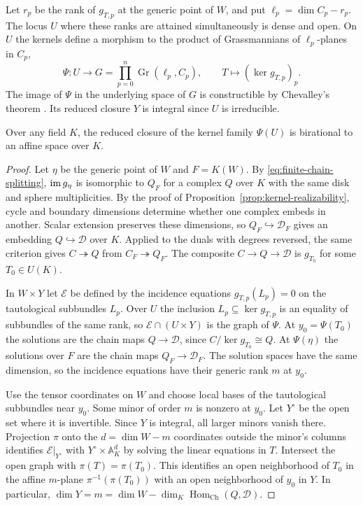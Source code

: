 Let $r_p$ be the rank of $g_{T,p}$ at the generic point of $W$,
and put $\ell_p=\dim C_p-r_p$. The locus $U$ where these ranks are attained
simultaneously is dense and open. On $U$ the kernels define a morphism to
the product of Grassmannians of $\ell_p$-planes in $C_p$,
\begin{equation}\label{eq:kernel-map}
 \Psi:U\longrightarrow G=\prod_{p=0}^n\operatorname{Gr}(\ell_p,C_p),
 \qquad T\longmapsto (\ker g_{T,p})_p.
\end{equation}
The image of $\Psi$ in the underlying space of $G$ is constructible by
Chevalley's theorem \cite[Tag 054K]{Stacks}. Its reduced closure $Y$ is integral since $U$ is irreducible.

\begin{proposition}\label{prop:kernel-rationality}
Over any field $K$, the reduced closure of the kernel family $\Psi(U)$ is
birational to an affine space over $K$.
\end{proposition}
\begin{proof}
Let $\eta$ be the generic point of $W$ and $F=K(W)$. By
\eqref{eq:finite-chain-splitting}, $\operatorname{im} g_\eta$ is isomorphic to $Q_F$ for a
complex $Q$ over $K$ with the same disk and sphere multiplicities.
By the proof of Proposition~\ref{prop:kernel-realizability}, cycle and boundary
dimensions determine whether one complex embeds in another. Scalar extension
preserves these dimensions, so $Q_F\hookrightarrow\mathcal D_F$ gives an embedding
$Q\hookrightarrow\mathcal D$ over $K$. Applied to the duals with degrees reversed,
the same criterion gives $C\twoheadrightarrow Q$ from $C_F\twoheadrightarrow Q_F$.
The composite $C\to Q\to\mathcal D$ is $g_{T_0}$ for some $T_0\in U(K)$.

In $W\times Y$ let $\mathcal E$ be defined by the incidence equations
$g_{T,p}(L_p)=0$ on the tautological subbundles $L_p$.
Over $U$ the inclusion $L_p\subseteq\ker g_{T,p}$ is an equality of subbundles
of the same rank, so $\mathcal E\cap(U\times Y)$ is the graph of $\Psi$.
At $y_0=\Psi(T_0)$ the solutions are the chain maps $Q\to\mathcal D$,
since $C/\ker g_{T_0}\cong Q$. At $\Psi(\eta)$ the solutions over $F$ are the
chain maps $Q_F\to\mathcal D_F$. The solution spaces have the same dimension, so
the incidence equations have their generic rank $m$ at $y_0$.

Use the tensor coordinates on $W$ and choose local bases of the tautological
subbundles near $y_0$. Some minor of order $m$ is nonzero at $y_0$.
Let $Y^\circ$ be the open set where it is invertible. Since $Y$ is integral, all larger
minors vanish there. Projection $\pi$ onto the $d=\dim W-m$ coordinates
outside the minor's columns identifies $\mathcal E|_{Y^\circ}$ with
$Y^\circ\times\mathbb A_K^d$ by solving the linear equations in $T$.
Intersect the open graph with $\pi(T)=\pi(T_0)$. This identifies an open
neighborhood of $T_0$ in the affine $m$-plane $\pi^{-1}(\pi(T_0))$
with an open neighborhood of $y_0$ in $Y$. In particular,
$\dim Y=m=\dim W-\dim_K\operatorname{Hom}_{\mathrm{Ch}}(Q,\mathcal D)$.
\end{proof}

